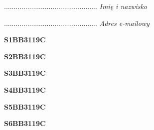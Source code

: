\begin{turn}{90}\begin{minipage}{\linewidth} \vspace{20mm} ................................................  \textit{Imię i nazwisko}\end{minipage}\end{turn}

\begin{turn}{90}\begin{minipage}{\linewidth} \vspace{20mm} ................................................  \textit{Adres e-mailowy}\end{minipage}\end{turn}

\begin{turn}{90}\huge \begin{minipage}{\linewidth} \vspace{10mm}\textbf{S1BB3119C}\end{minipage}\end{turn}

\begin{turn}{90}\huge \begin{minipage}{\linewidth} \vspace{10mm}\textbf{S2BB3119C}\end{minipage}\end{turn}

\begin{turn}{90}\huge \begin{minipage}{\linewidth} \vspace{10mm}\textbf{S3BB3119C}\end{minipage}\end{turn}

\begin{turn}{90}\huge \begin{minipage}{\linewidth} \vspace{10mm}\textbf{S4BB3119C}\end{minipage}\end{turn}

\begin{turn}{90}\huge \begin{minipage}{\linewidth} \vspace{10mm}\textbf{S5BB3119C}\end{minipage}\end{turn}

\begin{turn}{90}\huge \begin{minipage}{\linewidth} \vspace{10mm}\textbf{S6BB3119C}\end{minipage}\end{turn}

